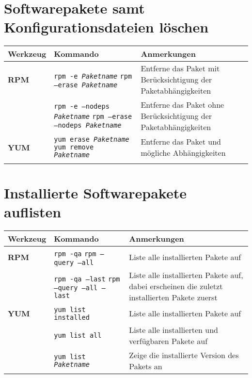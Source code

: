 \documentclass[10pt,a4paper]{article}
\begin{document}
\section{Softwarepakete samt Konfigurationsdateien löschen}
\begin{tabular}{ p{3.5cm} p{9cm} p{11cm}}
  \hline
  \rowcolor{Gray}
  \textbf{Werkzeug} & \textbf{Kommando} & \textbf{Anmerkungen} \\
  \hline 
  \textbf{RPM} & \texttt{rpm -e \textit{Paketname}} \newline \texttt{rpm --erase \textit{Paketname}} & Entferne das Paket mit Berücksichtigung der Paketabhängigkeiten\\
  \rowcolor{Gray}
  & \texttt{rpm -e --nodeps \textit{Paketname}} \newline \texttt{rpm --erase  --nodeps \textit{Paketname}} & Entferne das Paket ohne Berücksichtigung der Paketabhängigkeiten\\
  \textbf{YUM} & \texttt{yum erase \textit{Paketname}} \newline \texttt{yum remove \textit{Paketname}} & Entferne das Paket und mögliche Abhängigkeiten\\
  \rowcolor{Gray}
  \hline
\end{tabular}

\newpage

\cheatsheet

\section{Installierte Softwarepakete auflisten}
\begin{tabular}{ p{3.5cm} p{9cm} p{11cm}}
  \hline
  \rowcolor{Gray}
  \textbf{Werkzeug} & \textbf{Kommando} & \textbf{Anmerkungen} \\
  \hline 
  \textbf{RPM} & \texttt{rpm -qa} \newline \texttt{rpm --query --all} & Liste alle installierten Pakete auf\\
  \rowcolor{Gray}
  & \texttt{rpm -qa --last} \newline \texttt{rpm --query --all --last} & Liste alle installierten Pakete auf, dabei erscheinen die zuletzt installierten Pakete zuerst\\
  \textbf{YUM} & \texttt{yum list installed} & Liste alle installierten Pakete auf\\
  \rowcolor{Gray}
  & \texttt{yum list all} & Liste alle installierten und verfügbaren Pakete auf\\
  & \texttt{yum list \textit{Paketname}} & Zeige die installierte Version des Pakets an\\
  \hline
\end{tabular}
\end{document}

